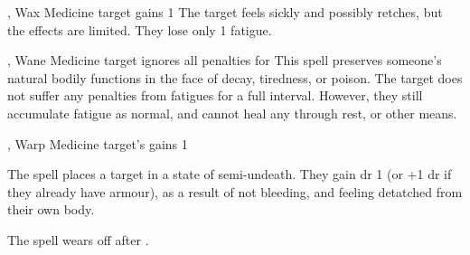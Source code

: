   {\mFate, \mAir}%
  {Wax}%
  {}%
  {Medicine}%
  {target gains 1 }%
  {
    The target feels sickly and possibly retches, but the effects are limited.
    They lose only 1 \gls{fatigue}.
  }

  {\mFate, \mAir}%
  {Wane}%
  {}%
  {Medicine}%
  {target ignores all  penalties for }%
  {
    This spell preserves someone's natural bodily functions in the face of decay, tiredness, or poison.
    The target does not suffer any penalties from \glspl{fatigue} for a full \gls{interval}.
    However, they still accumulate \gls{fatigue} as normal, and cannot heal any through rest, or other means.
  }

  {\mFate, \mAir}%
  {Warp}%
  {}%
  {Medicine}%
  {target's gains  1}%
  {
    The spell places a target in a state of semi-undeath.
    They gain \gls{dr} 1 (or +1 \gls{dr} if they already have armour), as a result of not bleeding, and feeling detatched from their own body.

    The spell wears off after .
  }

